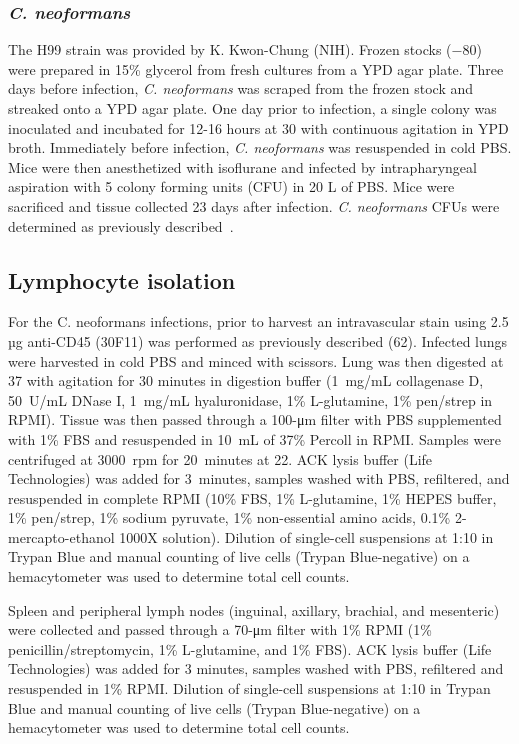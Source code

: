 \subsubsection{\textit{C. neoformans}}

The H99 strain was provided by K. Kwon-Chung (NIH). Frozen stocks ($-80$) were prepared in 15\% glycerol from fresh cultures from a YPD agar plate. Three days before infection, \textit{C. neoformans} was scraped from the frozen stock and streaked onto a YPD agar plate. One day prior to infection, a single colony was inoculated and incubated for 12-16 hours at 30 with continuous agitation in YPD broth. Immediately before infection, \textit{C. neoformans} was resuspended in cold PBS. Mice were then anesthetized with isoflurane and infected by intrapharyngeal aspiration with 5 colony forming units (CFU) in 20 \textmu{}L of PBS. Mice were sacrificed and tissue collected 23 days after infection. \textit{C. neoformans} CFUs were determined as previously described~\cite{schneider2020migration}.

\subsection{Lymphocyte isolation}

For the C. neoformans infections, prior to harvest an intravascular stain using 2.5 µg anti-CD45 (30F11) was performed as previously described (62). Infected lungs were harvested in cold PBS and minced with scissors. Lung was then digested at 37 with agitation for 30 minutes in digestion buffer (1~mg/mL collagenase D, 50~U/mL DNase I, 1~mg/mL hyaluronidase, 1\% L-glutamine, 1\% pen/strep in RPMI). Tissue was then passed through a 100-μm filter with PBS supplemented with 1\% FBS and resuspended in 10~mL of 37\% Percoll in RPMI. Samples were centrifuged at 3000~rpm for 20~minutes at 22. ACK lysis buffer (Life Technologies) was added for 3~minutes, samples washed with PBS, refiltered, and resuspended in complete RPMI (10\% FBS, 1\% L-glutamine, 1\% HEPES buffer, 1\% pen/strep, 1\% sodium pyruvate, 1\% non-essential amino acids, 0.1\% 2-mercapto-ethanol 1000X solution). Dilution of single-cell suspensions at 1:10 in Trypan Blue and manual counting of live cells (Trypan Blue-negative) on a hemacytometer was used to determine total cell counts.

Spleen and peripheral lymph nodes (inguinal, axillary, brachial, and mesenteric) were collected and passed through a 70-μm filter with 1\% RPMI (1\% penicillin/streptomycin, 1\% L-glutamine, and 1\% FBS). ACK lysis buffer (Life Technologies) was added for 3 minutes, samples washed with PBS, refiltered and resuspended in 1\% RPMI. Dilution of single-cell suspensions at 1:10 in Trypan Blue and manual counting of live cells (Trypan Blue-negative) on a hemacytometer was used to determine total cell counts.

